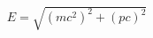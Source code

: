 \documentclass{article}
\begin{document}
\begin{align*}E = \sqrt{(mc^2)^2 + (pc)^2}\end{align*}
\end{document}
